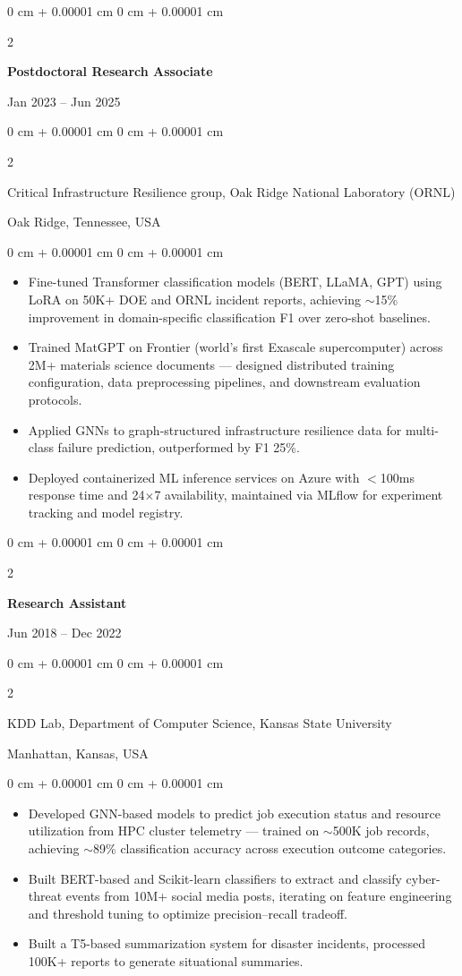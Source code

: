 \documentclass[10pt, letterpaper]{article}
\newenvironment{highlights}{
    \begin{itemize}[
        topsep=0.10 cm,
        parsep=0.10 cm,
        partopsep=0pt,
        itemsep=0pt,
        leftmargin=0 cm + 10pt
    ]
}{
    \end{itemize}
} %
\newenvironment{onecolentry}{
    \begin{adjustwidth}{
        0 cm + 0.00001 cm
    }{
        0 cm + 0.00001 cm
    }
}{
    \end{adjustwidth}
} %
\newenvironment{twocolentry}[2][]{
    \onecolentry
    \def\secondColumn{#2}
    \setcolumnwidth{\fill, 4.5 cm}
    \begin{paracol}{2}
}{
    \switchcolumn \raggedleft \secondColumn
    \end{paracol}
    \endonecolentry
} %
\begin{document}
    \begin{twocolentry}{Jan 2023 -- Jun 2025}
        \textbf{Postdoctoral Research Associate}
    \end{twocolentry}
    \begin{twocolentry}{Oak Ridge, Tennessee, USA}
        Critical Infrastructure Resilience group, Oak Ridge National Laboratory (ORNL)
    \end{twocolentry}
    \vspace{0.10 cm}
    \begin{onecolentry}
        \begin{highlights}
            \item Fine-tuned Transformer classification models (BERT, LLaMA, GPT) using LoRA on 50K+ DOE and ORNL incident reports, achieving $\sim$15\% improvement in domain-specific classification F1 over zero-shot baselines.
            \item Trained MatGPT on Frontier (world’s first Exascale supercomputer) across 2M+ materials science documents — designed distributed training configuration, data preprocessing pipelines, and downstream evaluation protocols.
            \item Applied GNNs to graph-structured infrastructure resilience data for multi-class failure prediction, outperformed by F1 25\%.
            \item Deployed containerized ML inference services on Azure with $<$100ms response time and 24$\times$7 availability, maintained via MLflow for experiment tracking and model registry.
        \end{highlights}
    \end{onecolentry}

    \vspace{1mm}

    \begin{twocolentry}{Jun 2018 -- Dec 2022}
        \textbf{Research Assistant}
    \end{twocolentry}
    \begin{twocolentry}{Manhattan, Kansas, USA}
       KDD Lab, Department of Computer Science, Kansas State University
    \end{twocolentry}
    \vspace{0.10 cm}
    \begin{onecolentry}
        \begin{highlights}
            \item Developed GNN-based models to predict job execution status and resource utilization from HPC cluster telemetry — trained on $\sim$500K job records, achieving $\sim$89\% classification accuracy across execution outcome categories.
            \item Built BERT-based and Scikit-learn classifiers to extract and classify cyber-threat events from 10M+ social media posts, iterating on feature engineering and threshold tuning to optimize precision--recall tradeoff.
            \item Built a T5-based summarization system for disaster incidents, processed 100K+ reports to generate situational summaries.
        \end{highlights}
    \end{onecolentry}
\end{document}
